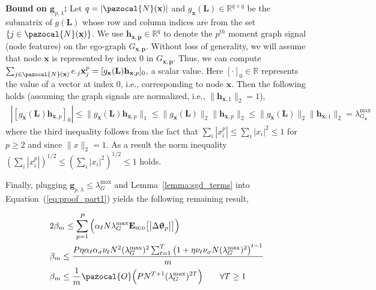 \documentclass{article}
\newcommand{\Na}{\pazocal{N}}
\newcommand{\BigO}{\pazocal{O}}
\begin{document}
\noindent \textbf{Bound on $\mathbf{g}_{p, \lambda}$: }   Let   $q=|\Na(\mathbf{x})|$ and $g_{\mathbf{x}}(\mathbf{L}) \in \mathbb{R}^{q \times q}$ be the submatrix of  $g(\mathbf{L})$ whose row and column indices are from the set $\{j \in  \Na(\mathbf{x})\}$.  We use $\mathbf{h}_{\mathbf{x, p}} \in \mathbb{R}^{q}$ to denote the $p^{th}$ moment graph signal  (node features) on the ego-graph $G_\mathbf{x, p}$.  Without loss of generality, we will assume that node $\mathbf{x}$ is represented by index $0$ in   $G_\mathbf{x, p}$. Thus, we can compute $ \sum_{j \in \Na(\mathbf{x})} e_{\cdot j}  \mathbf{x}^{p}_{j} = [g_{\mathbf{x}}(\mathbf{L}) \mathbf{h}_{\mathbf{x}, p}]_0$, a scalar value. Here $[\cdot]_0 \in \mathbb{R}$ represents the value of a vector at index 0, i.e., corresponding to  node $\mathbf{x}$. Then the following holds (assuming the graph signals are normalized, i.e., $\| \mathbf{h}_{\mathbf{x}, 1} \|_{2}=1$),
\begin{equation}~\label{eq:g_lambda} 	
\begin{split}
|[g_{\mathbf{x}}(\mathbf{L}) \mathbf{h}_{\mathbf{x}, p}]_0| \leq \|g_{\mathbf{x}}(\mathbf{L})  \mathbf{h}_{\mathbf{x}, p} \|_{1} \leq \|g_{\mathbf{x}}(\mathbf{L})\|_2  \|\mathbf{h}_{\mathbf{x}, p} \|_{2}  \leq  \|g_{\mathbf{x}}(\mathbf{L})\|_2  \|\mathbf{h}_{\mathbf{x}, 1} \|_{2} =   \lambda_{G_\mathbf{x}}^{\max}   
\end{split} 
\end{equation}
where the third inequality follows from the fact that $\sum_{i} |x^{p}_{i}| \leq \sum_{i} |x_{i}|^{2} \leq 1 $ for $p \geq 2$ and since $  \|x\|_2 = 1$. As a result the norm inequality $(\sum_{i} |x^{p}_{i}|)^{1/2} \leq   (\sum_{i} |x_{i}|^{2})^{1/2} \leq 1 $ holds. 


Finally, plugging $\mathbf{g}_{p, \lambda} \leq \lambda_{G}^{\max}$ and Lemma~\ref{lemma:sgd_terms} into Equation~(\ref{eq:proof_part1}) yields the following remaining result,

\begin{equation*} 	
\begin{split}
& 2\beta_{m}  \leq   \sum_{p=1}^{P}  \Big(  \alpha_{\ell} N \lambda_{G}^{\max}   \mathbf{E}_{\textsc{sgd}}\big[\big|\Delta \bm{\uptheta}_{p} \big|\big]  \Big)    \\      
& \beta_{m}  \leq   \frac{ P \eta \alpha_{\ell}   \alpha_{\sigma} \nu_{\ell} N^2 (\lambda_{G}^{\max})^2 \sum_{t=1}^{T} \big( 1 + \eta\nu_{\ell}  \nu_{\sigma} N (\lambda_{G}^{\max})^2 \big)^{t-1}}{m}    \\  
&   \beta_{m}  \leq  \frac{1}{m}\BigO \Big(P N^{T+1} (\lambda_{G}^{\max})^{2T}\Big)  \hspace{2em} \forall T \geq 1  \\ 
\end{split} 
\end{equation*}
\end{document}
